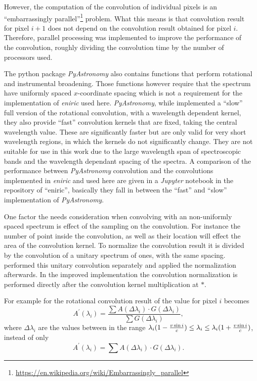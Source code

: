 However, the computation of the convolution of individual pixels is an ``embarrassingly parallel''\footnote{\href{https://en.wikipedia.org/wiki/Embarrassingly\_parallel}{https://en.wikipedia.org/wiki/Embarrassingly\_parallel}} problem.
What this means is that convolution result for pixel $i+1$ does not depend on the convolution result obtained for pixel $i$.
Therefore, parallel processing was implemented to improve the performance of the convolution, roughly dividing the convolution time by the number of processors used.

The python package \emph{PyAstronomy} also contains functions that perform rotational and instrumental broadening.
Those functions however require that the spectrum have uniformly spaced $x$-coordinate spacing which is not a requirement for the implementation of \emph{eniric} used here.
\emph{PyAstronomy}, while implemented a ``slow'' full version of the rotational convolution, with a wavelength dependent kernel, they also provide ``fast'' convolution kernels that are fixed, taking the central wavelength value.
These are significantly faster but are only valid for very short wavelength regions, in which the kernels do not significantly change.
They are not suitable for use in this work due to the large wavelength span of spectroscopic bands and the wavelength dependant spacing of the spectra.
A comparison of the performance between \emph{PyAstronomy} convolution and the convolutions implemented in \emph{eniric} and used here are given in a \emph{Jupyter} notebook in the repository of ``eniric'', basically they fall in between the ``fast'' and ``slow'' implementation of \emph{PyAstronomy}.

One factor the needs consideration when convolving with an non-uniformly spaced spectrum is effect of the sampling on the convolution.
For instance the number of point inside the convolution, as well as their location will effect the area of the convolution kernel.
To normalize the convolution result it is divided by the convolution of a unitary spectrum of ones, with the same spacing.
\citet{figueira_radial_2016} performed this unitary convolution separately and applied the normalization afterwards.
In the improved implementation the convolution normalization is performed directly after the convolution kernel multiplication at \(\textbf{*}\).

For example for the rotational convolution result of the value for pixel $i$ becomes
\[{A}^{\prime}(\lambda_{i}) =  \frac{\sum A(\Delta\lambda_{i}) \cdot G(\Delta\lambda_{i})}{\sum G(\Delta\lambda_{i})},\]
where $\Delta\lambda_{i}$ are the values between in the range $\lambda_{i} (1-\frac{v\sin{i}}{c}) \le\lambda_{i} \le \lambda_{i} (1+ \frac{v\sin{i}}{c})$,
instead of only
\[{A}^{\prime}(\lambda_{i}) =  \sum A(\Delta\lambda_{i}) \cdot G(\Delta\lambda_{i}).\]


